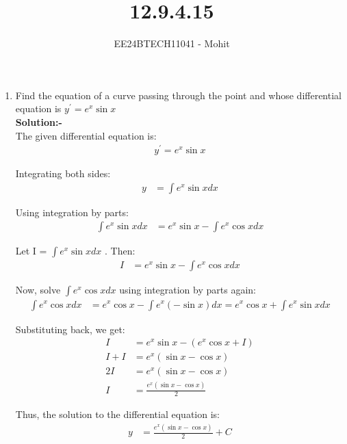 \documentclass[journal]{IEEEtran}
\numberwithin{equation}{enumi}
\numberwithin{figure}{enumi}
\begin{document}

\title{12.9.4.15}
\author{EE24BTECH11041 - Mohit}
{\let\newpage\relax\maketitle}
\begin{enumerate}
\item Find the equation of a curve passing through the point  and whose differential equation
 is $y^{'} = e^x\sin{x}$\\
\textbf{Solution:-}\\

The given differential equation is:
\begin{align}
y^{'} = e^x \sin{x}
\end{align}

Integrating both sides:
\begin{align}
y &= \int e^x \sin{x}dx
\end{align}

Using integration by parts:
\begin{align}
\int e^x \sin{x}dx &= e^x \sin{x} - \int e^x \cos{x} dx
\end{align}

Let I = $\int e^x \sin{x} dx$ . Then:
\begin{align}
I &= e^x \sin{x} - \int e^x \cos{x}dx
\end{align}

Now, solve $\int e^x \cos{x}dx$ using integration by parts again:
\begin{align}
\int e^x \cos{x}dx &= e^x \cos{x} - \int e^x (-\sin{x}) dx
= e^x \cos x + \int e^x \sin{x}dx
\end{align}

Substituting back, we get:
\begin{align}
I &= e^x \sin{x} - (e^x \cos{x} + I) \\
I + I &= e^x (\sin{x} - \cos{x}) \\
2I &= e^x (\sin{x} - \cos{x}) \\
I &= \frac{e^x (\sin{x} - \cos{x})}{2}
\end{align}

Thus, the solution to the differential equation is:
\begin{align}
y &= \frac{e^x (\sin{x} - \cos{x})}{2} + C
\end{align}


\end{enumerate}
\end{document}
